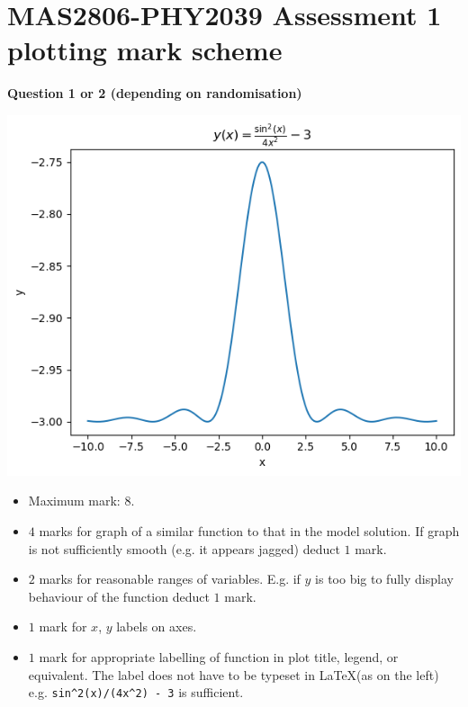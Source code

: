 \documentclass[oneside,12pt]{article}
\begin{document}
	
	\section*{MAS2806-PHY2039 Assessment 1 plotting mark scheme}
	
	\noindent\textbf{Question 1 or 2 (depending on randomisation)}
	
	\begin{minipage}{0.49\textwidth}
		\includegraphics[scale=0.65]{q1.png}
	\end{minipage}
	\begin{minipage}{0.49\textwidth}
		\begin{itemize}
			\item Maximum mark: \(8\).
			\item \(4\) marks for graph of a similar function to that in the model solution. If graph is not sufficiently smooth (e.g. it appears jagged) deduct \(1\) mark.
			\item \(2\) marks for reasonable ranges of variables. E.g. if \(y\) is too big to fully display behaviour of the function deduct \(1\) mark.
			\item \(1\) mark for \(x\), \(y\) labels on axes.
			\item \(1\) mark for appropriate labelling of function in plot title, legend, or equivalent. The label does not have to be typeset in \LaTeX (as on the left) e.g. \verb|sin^2(x)/(4x^2) - 3| is sufficient.
		\end{itemize}
	\end{minipage}
	
\end{document}
